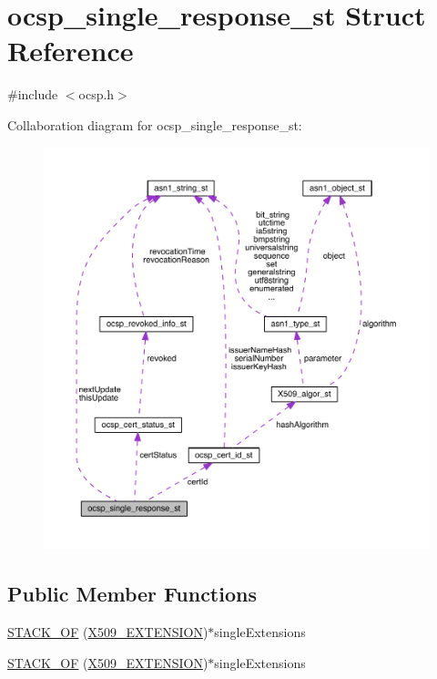 \hypertarget{structocsp__single__response__st}{}\section{ocsp\+\_\+single\+\_\+response\+\_\+st Struct Reference}
\label{structocsp__single__response__st}


{\ttfamily \#include $<$ocsp.\+h$>$}



Collaboration diagram for ocsp\+\_\+single\+\_\+response\+\_\+st\+:\nopagebreak
\begin{figure}[H]
\begin{center}
\leavevmode
\includegraphics[width=350pt]{structocsp__single__response__st__coll__graph}
\end{center}
\end{figure}
\subsection*{Public Member Functions}
\begin{DoxyCompactItemize}
\item 
\hyperlink{structocsp__single__response__st_ad8d403702fd25edb86af3781b2bad612}{S\+T\+A\+C\+K\+\_\+\+OF} (\hyperlink{crypto_2x509_2x509_8h_ab2f7f7dc0ced8684e0cbfc818e408304}{X509\+\_\+\+E\+X\+T\+E\+N\+S\+I\+ON})$\ast$single\+Extensions
\item 
\hyperlink{structocsp__single__response__st_ad8d403702fd25edb86af3781b2bad612}{S\+T\+A\+C\+K\+\_\+\+OF} (\hyperlink{crypto_2x509_2x509_8h_ab2f7f7dc0ced8684e0cbfc818e408304}{X509\+\_\+\+E\+X\+T\+E\+N\+S\+I\+ON})$\ast$single\+Extensions
\end{DoxyCompactItemize}
